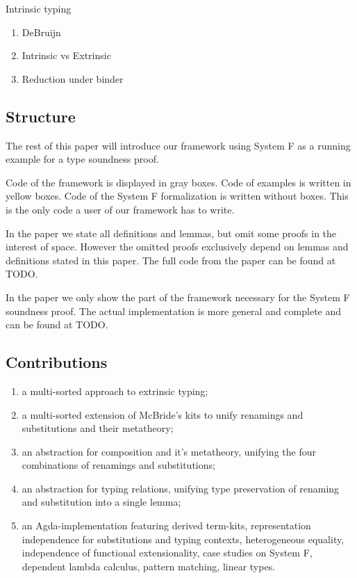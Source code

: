 \documentclass[sigplan,10pt]{acmart}
\begin{document}
  Intrinsic typing 


  \begin{enumerate}
  \item DeBruijn
  \item Intrinsic vs Extrinsic
  \item Reduction under binder
  \end{enumerate}

  \subsection{Structure}
  The rest of this paper will introduce our framework using System F
  as a running example for a type soundness proof.

  Code of the framework is displayed in gray boxes.
  Code of examples is written in yellow boxes.
  Code of the System F formalization is written without boxes. This is
  the only code a user of our framework has to write.

  In the paper we state all definitions and lemmas, but omit some proofs
  in the interest of space. However the omitted proofs exclusively
  depend on lemmas and definitions stated in this paper. The full code
  from the paper can be found at TODO.

  In the paper we only show the part of the framework necessary for
  the System F soundness proof. The actual implementation is more
  general and complete and can be found at TODO.

  \subsection{Contributions}
  \begin{enumerate}
  \item
    a multi-sorted approach to extrinsic typing;
  \item
    a multi-sorted extension of McBride's kits to unify renamings and substitutions and their metatheory;
  \item
    an abstraction for composition and it's metatheory, unifying the four combinations of renamings and substitutions;
  \item
    an abstraction for typing relations, unifying type preservation of renaming and substitution into a single lemma;
  \item
    an Agda-implementation featuring derived term-kits, representation
    independence for substitutions and typing contexts, heterogeneous
    equality, independence of functional extensionality, case studies
    on System F, dependent lambda calculus, pattern matching, linear
    types.
  \end{enumerate}
\end{document}
